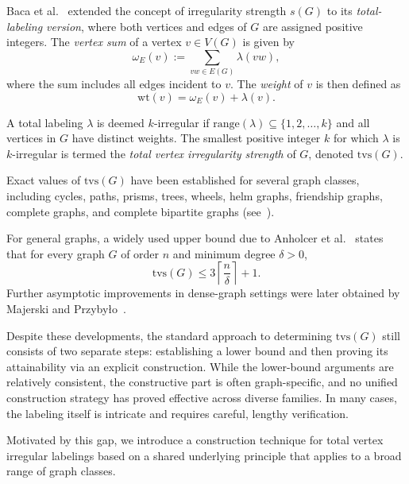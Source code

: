 \documentclass[11pt]{article}
\numberwithin{equation}{section}
\begin{document}
Baca et al.~\cite{bacaIrregularTotalLabellings2007} extended the concept of irregularity strength \(s(G)\) to its \emph{total-labeling version}, where both vertices and edges of \(G\) are assigned positive integers.
The \emph{vertex sum} of a vertex \(v \in V(G)\) is given by
\[
\omega_E(v) := \sum_{vw \in E(G)} \lambda(vw),
\]
where the sum includes all edges incident to \(v\). The \emph{weight} of \(v\) is then defined as
\[
\mathrm{wt}(v) = \omega_E(v) + \lambda(v).
\]

A total labeling \(\lambda\) is deemed \(k\)-irregular if \(\mathrm{range}(\lambda) \subseteq \{1, 2, \ldots, k\}\) and all vertices in \(G\) have distinct weights. The smallest positive integer \(k\) for which \(\lambda\) is \(k\)-irregular is termed the \emph{total vertex irregularity strength} of \(G\), denoted \(\mathrm{tvs}(G)\).

Exact values of \(\mathrm{tvs}(G)\) have been established for several graph classes, including cycles, paths, prisms, trees, wheels, helm graphs, friendship graphs, complete graphs, and complete bipartite graphs (see~\cite{bacaIrregularTotalLabellings2007, nurdinTotalVertexIrregularity2010, wijaya2008total, ahmadTotalVertexIrregularity, Wijaya2005}).

For general graphs, a widely used upper bound due to Anholcer et al.~\cite{anholcer2009upper} states that for every graph \(G\) of order \(n\) and minimum degree \(\delta>0\),
\[
\mathrm{tvs}(G)\le 3\left\lceil\frac{n}{\delta}\right\rceil+1.
\]
Further asymptotic improvements in dense-graph settings were later obtained by Majerski and Przyby{\l}o~\cite{majerski2013dense}.

Despite these developments, the standard approach to determining \(\mathrm{tvs}(G)\) still consists of two separate steps: establishing a lower bound and then proving its attainability via an explicit construction. While the lower-bound arguments are relatively consistent, the constructive part is often graph-specific, and no unified construction strategy has proved effective across diverse families. In many cases, the labeling itself is intricate and requires careful, lengthy verification.

Motivated by this gap, we introduce a construction technique for total vertex irregular labelings based on a shared underlying principle that applies to a broad range of graph classes.
\end{document}
